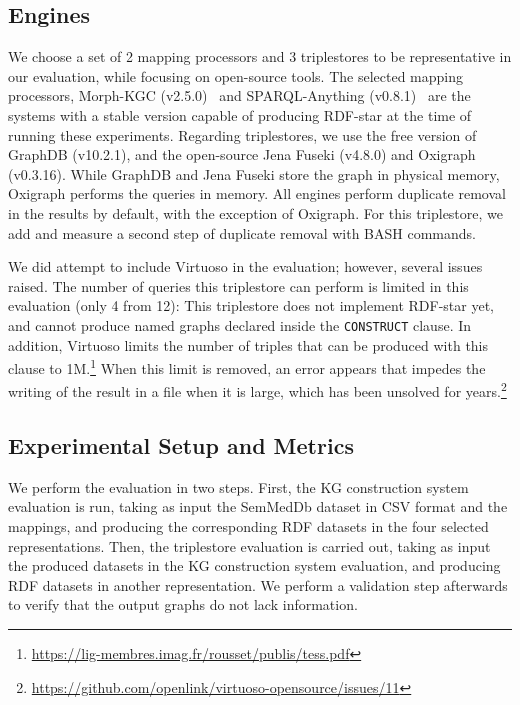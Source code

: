 \subsection{Engines}
\label{sec:chp6-1_engines}
We choose a set of 2 mapping processors and 3 triplestores to be representative in our evaluation, while focusing on open-source tools. 
The selected mapping processors, Morph-KGC (v2.5.0)~\parencite{arenas2022morphkgc} and SPARQL-Anything (v0.8.1)~\parencite{asprino2023sparql-anything} are the systems with a stable version capable of producing RDF-star at the time of running these experiments. 
Regarding triplestores, we use the free version of GraphDB (v10.2.1), and the open-source Jena Fuseki (v4.8.0) and Oxigraph (v0.3.16). While GraphDB and Jena Fuseki store the graph in physical memory, Oxigraph performs the queries in memory. All engines perform duplicate removal in the results by default, with the exception of Oxigraph. For this triplestore, we add and measure a second step of duplicate removal with BASH commands.


We did attempt to include Virtuoso in the evaluation; however, several issues raised. The number of queries this triplestore can perform is limited in this evaluation (only 4 from 12): This triplestore
does not implement RDF-star yet, and cannot produce named graphs declared inside the \texttt{CONSTRUCT} clause. In addition, Virtuoso limits the number of triples that can be produced with this clause to 1M.\footnote{\url{https://lig-membres.imag.fr/rousset/publis/tess.pdf}} When this limit is removed, an error appears that impedes the writing of the result in a file when it is large, which has been unsolved for years.\footnote{\url{https://github.com/openlink/virtuoso-opensource/issues/11}} 




\subsection{Experimental Setup and Metrics}
\label{sec:chp6-1_exp-setup}
We perform the evaluation in two steps. First, the KG construction system evaluation is run, taking as input the SemMedDb dataset in CSV format and the mappings, and producing the corresponding RDF datasets in the four selected representations. Then, the triplestore evaluation is carried out, taking as input the produced datasets in the KG construction system evaluation, and producing RDF datasets in another representation. We perform a validation step afterwards to verify that the output graphs do not lack information.


